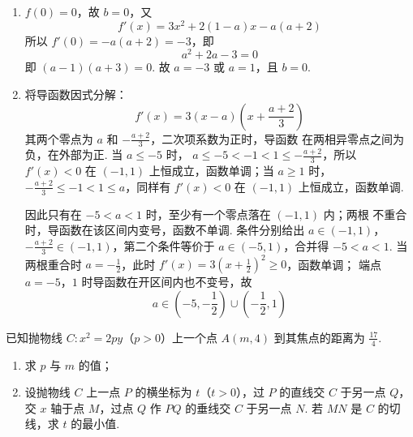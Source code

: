 \begin{solution}
\begin{enumerate}
\item \(f(0)=0\)，故 \(b=0\)，又
\[
f'(x)=3x^2+2(1-a)x-a(a+2)
\]
所以 \(f'(0)=-a(a+2)=-3\)，即
\[
a^2+2a-3=0
\]
即 \((a-1)(a+3)=0\).
故 \(a=-3\) 或 \(a=1\)，且 \(b=0\).
\item 将导函数因式分解：
\[
f'(x)=3(x-a)\left(x+\frac{a+2}{3}\right)
\]
其两个零点为 \(a\) 和 \(-\frac{a+2}{3}\)，二次项系数为正时，导函数
在两相异零点之间为负，在外部为正. 当 \(a\leqslant-5\) 时，
\(a\leqslant-5<-1<1\leqslant-\frac{a+2}{3}\)，所以 \(f'(x)<0\)
在 \((-1,1)\) 上恒成立，函数单调；当 \(a\geqslant1\) 时，
\(-\frac{a+2}{3}\leqslant-1<1\leqslant a\)，同样有 \(f'(x)<0\)
在 \((-1,1)\) 上恒成立，函数单调.

因此只有在 \(-5<a<1\) 时，至少有一个零点落在 \((-1,1)\) 内；两根
不重合时，导函数在该区间内变号，函数不单调. 条件分别给出
\(a\in(-1,1)\)，\(-\frac{a+2}{3}\in(-1,1)\)，第二个条件等价于
\(a\in(-5,1)\)，合并得 \(-5<a<1\). 当两根重合时
\(a=-\frac12\)，此时 \(f'(x)=3(x+\frac12)^2\geqslant0\)，函数单调；
端点 \(a=-5\)，\(1\) 时导函数在开区间内也不变号，故
\[
a\in\left(-5,-\frac12\right)\cup\left(-\frac12,1\right)
\]
\end{enumerate}
\end{solution}

\begin{problem}
已知抛物线 \(C: x^{2} = 2py \)（\(p > 0\)）上一个点 \(A(m,4)\) 到其焦点的距离为 \(\frac{17}{4}\).
\begin{enumerate}
\item 求 \(p\) 与 \(m\) 的值；
\item 设抛物线 \(C\) 上一点 \(P\) 的横坐标为 \(t\)（\(t > 0\)），过 \(P\) 的直线交 \(C\) 于另一点 \(Q\)，交 \(x\) 轴于点 \(M\)，过点 \(Q\) 作 \(PQ\) 的垂线交 \(C\) 于另一点 \(N\). 若 \(MN\) 是 \(C\) 的切线，求 \(t\) 的最小值.
\end{enumerate}

\end{problem}

